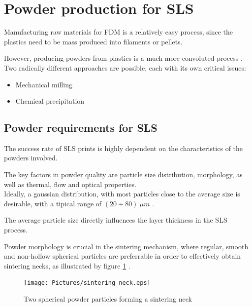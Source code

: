 \documentclass{article}
\begin{document}
    \section{Powder production for SLS \label{Powder_production}}

    Manufacturing raw materials for FDM is a relatively easy process, since the plastics need to be mass produced into filaments or pellets.

    However, producing powders from plastics is a much more convoluted process \autocites{doi:10.1063/1.4918516,Dechet_Schmidt_thermal_rounding,Recent_progress_polymers_AM}. \\ 

    Two radically different approaches are possible, each with its own critical issues: 

    \begin{itemize}
        \item Mechanical milling
        \item Chemical precipitation
    \end{itemize} 

    \subsection{Powder requirements for SLS \label{Powder_requirements}}

    The success rate of SLS prints is highly dependent on the characteristics of the powders involved. 

    The key factors in powder quality are particle size distribution, morphology, as well as thermal, flow and optical properties. \\
    
    Ideally, a gaussian distribution, with most particles close to the average size is desirable, 
    with a tipical range of $(20 \div 80) \ \mu m$ \autocite*{doi:10.1063/1.4918516}. 

    The average particle size directly influences the layer thickness in the SLS process.  
    
    Powder morphology is crucial in the sintering mechanism, where regular, smooth and non-hollow spherical 
    particles are preferrable in order to effectively obtain sintering necks, as illustrated by figure \ref{fig:SLS_sintering_neck} \autocite*{doi:10.1063/1.4918516}.  

    \begin{figure}[h!]
        \centering
        \texttt{[image: Pictures/sintering\_neck.eps]}\\
        \caption{Two spherical powder particles forming a sintering neck \autocite{Inkscape}} 
        \label{fig:SLS_sintering_neck}
    \end{figure}
\end{document}
